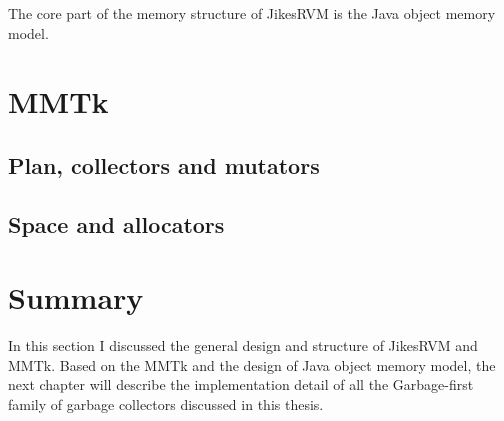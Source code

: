 The core part of the memory structure of JikesRVM is the Java object memory model.



\section{MMTk}
\label{sec:mmtk}

\subsection{Plan, collectors and mutators}

\subsection{Space and allocators}

\section{Summary}

In this section I discussed the general design and structure of JikesRVM and MMTk.
Based on the MMTk and the design of Java object memory model, the next chapter will
describe the implementation detail of all the Garbage-first family of garbage collectors
discussed in this thesis.
